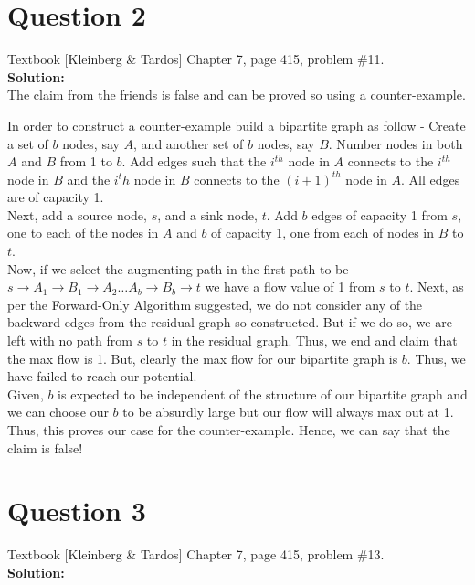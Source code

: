 \documentclass[11pt]{article}
\begin{document}
\clearpage
\section{Question 2} Textbook [Kleinberg \& Tardos] Chapter 7, page 415, problem \#11. \\
\textbf{Solution:} \\

The claim from the friends is false and can be proved so using a counter-example.

In order to construct a counter-example build a bipartite graph as follow - Create a set of $ b $ nodes, say $ A $, and another set of $ b $ nodes, say $ B $. Number nodes in both $ A $ and $ B $ from 1 to $ b $. Add edges such that the $ i^{th} $ node in $ A $ connects to the $ i^{th} $ node in $ B $ and the $ i^th $ node in $ B $ connects to the $ (i+1)^{th} $ node in $ A $. All edges are of capacity 1.\\

Next, add a source node, $ s $, and a sink node, $ t $. Add $ b $ edges of capacity 1 from $ s $, one to each of the nodes in $ A $ and $ b $ of capacity 1, one from each of nodes in $ B $ to $ t $. \\

Now, if we select the augmenting path in the first path to be $ s \to A_1 \to B_1 \to A_2 \ldots A_b \to B_b \to t$ we have a flow value of 1 from $ s $ to $ t $. Next, as per the Forward-Only Algorithm suggested, we do not consider any of the backward edges from the residual graph so constructed. But if we do so, we are left with no path from $ s $ to $ t $ in the residual graph. Thus, we end and claim that the max flow is 1. But, clearly the max flow for our bipartite graph is $ b $. Thus, we have failed to reach our potential. \\

Given, $ b $ is expected to be independent of the structure of our bipartite graph and we can choose our $ b $ to be absurdly large but our flow will always max out at 1. Thus, this proves our case for the counter-example. Hence, we can say that the claim is false!

\clearpage
\section{Question 3} Textbook [Kleinberg \& Tardos] Chapter 7, page 415, problem \#13. \\
\textbf{Solution:} \\
\end{document}
